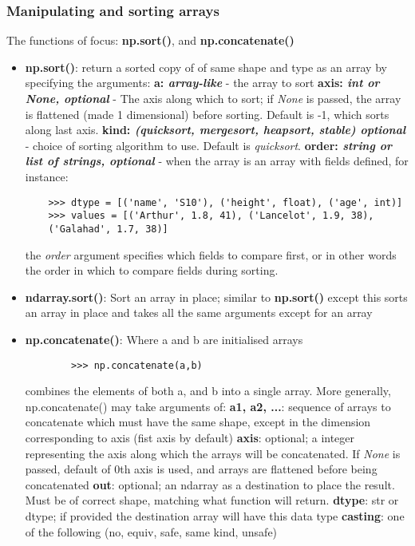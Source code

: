\documentclass[12pt, a4paper]{article}
\begin{document}
\subsubsection{Manipulating and sorting arrays}
The functions of focus: \textbf{np.sort()}, and \textbf{np.concatenate()}
\begin{itemize}
    \item \textbf{np.sort()}: return a sorted copy of of same shape and type as an array by specifying the arguments:
    \subitem \textbf{a: \textit{array-like}} - the array to sort
    \subitem \textbf{axis: \textit{int or None, optional}} - The axis along which to sort; if \textit{None} is passed, the array is flattened (made 1 dimensional) before sorting. Default is -1, which sorts along last axis.
    \subitem \textbf{kind: \textit{(quicksort, mergesort, heapsort, stable) optional}} - choice of sorting algorithm to use. Default is \textit{quicksort}.
    \subitem \textbf{order: \textit{string or list of strings, optional}} - when the array is an array with fields defined, for instance:
    \begin{lstlisting}
    >>> dtype = [('name', 'S10'), ('height', float), ('age', int)]
    >>> values = [('Arthur', 1.8, 41), ('Lancelot', 1.9, 38),
    ('Galahad', 1.7, 38)]
    \end{lstlisting}
    the \textit{order} argument specifies which fields to compare first, or in other words the order in which to compare fields during sorting.
    \item \textbf{ndarray.sort()}: Sort an array in place; similar to \textbf{np.sort()} except this sorts an array in place and takes all the same arguments except for an array
    \item \textbf{np.concatenate()}: Where a and b are initialised arrays
    \begin{lstlisting}
        >>> np.concatenate(a,b)
    \end{lstlisting}
    combines the elements of both a, and b into a single array. More generally, np.concatenate() may take arguments of:
    \subitem \textbf{a1, a2, ...}: sequence of arrays to concatenate which must have the same shape, except in the dimension corresponding to axis (fist axis by default)
    \subitem \textbf{axis}: optional; a integer representing the axis along which the arrays will be concatenated. If \textit{None} is passed, default of 0th axis is used, and arrays are flattened before being concatenated
    \subitem \textbf{out}: optional; an ndarray as a destination to place the result. Must be of correct shape, matching what function will return.
    \subitem \textbf{dtype}: str or dtype; if provided the destination array will have this data type
    \subitem \textbf{casting}: one of the following (no, equiv, safe, same kind, unsafe)
\end{itemize}
\end{document}

